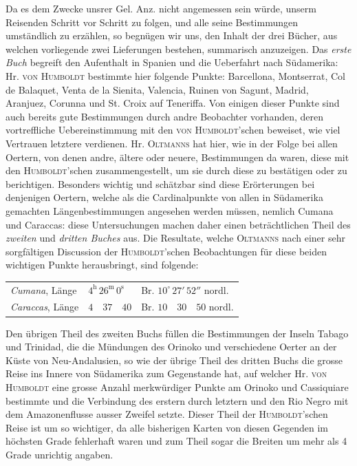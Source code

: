 Da es dem Zwecke unsrer Gel. Anz. nicht angemessen sein würde, unserm Reisenden Schritt vor Schritt zu folgen, und alle seine Bestimmungen umständlich zu erzählen, so begnügen wir uns, den Inhalt der drei Bücher, aus welchen vorliegende zwei Lieferungen bestehen, summarisch anzuzeigen. Das \emph{erste Buch} begreift den Aufenthalt in Spanien und die Ueberfahrt nach Südamerika: Hr. \textsc{von Humboldt} bestimmte hier folgende Punkte: Barcellona, Montserrat, Col de Balaquet, Venta de la Sienita, Valencia, Ruinen von Sagunt, Madrid, Aranjuez, Corunna und St. Croix auf Teneriffa. Von einigen dieser Punkte sind auch bereits gute Bestimmungen durch andre Beobachter vorhanden, deren vortreffliche Uebereinstimmung mit den \textsc{von Humboldt}'schen beweiset, wie viel Vertrauen letztere verdienen. Hr. \textsc{Oltmanns} hat hier, wie in der Folge bei allen Oertern, von denen andre, ältere oder neuere, Bestimmungen da waren, diese mit den \textsc{Humboldt}'schen zusammengestellt, um sie durch diese zu bestätigen oder zu berichtigen. Besonders wichtig und schätzbar sind diese Erörterungen bei denjenigen Oertern, welche als die Cardinalpunkte von allen in Südamerika gemachten Längenbestimmungen angesehen werden müssen, nemlich Cumana und Caraccas: diese Untersuchungen machen daher einen beträchtlichen Theil des \emph{zweiten} und \emph{dritten Buches} aus. Die Resultate, welche \textsc{Oltmanns} nach einer sehr sorgfältigen Discussion der \textsc{Humboldt}'schen Beobachtungen für diese beiden wichtigen Punkte herausbringt, sind folgende:
\begin{center} \begin{tabular}{@{}lll@{}} \textit{Cumana}, Länge & $4^{\mathrm h}\,26^{\mathrm m}\,0^{\mathrm s}$ & Br. $10^\circ\,27'\,52''$ nordl. \\ \textit{Caraccas}, Länge & $4\quad 37\quad 40$ & Br. $10\quad 30\quad 50$ nordl. \\ \end{tabular} \end{center}
\noindent Den übrigen Theil des zweiten Buchs füllen die Bestimmungen der Inseln Tabago und Trinidad, die die Mündungen des Orinoko und verschiedene Oerter an der Küste von Neu-Andalusien, so wie der übrige Theil des dritten Buchs die grosse Reise ins Innere von Südamerika zum Gegenstande hat, auf welcher Hr. \textsc{von Humboldt} eine grosse Anzahl merkwürdiger Punkte am Orinoko und Cassiquiare bestimmte und die Verbindung des erstern durch letztern und den Rio Negro mit dem Amazonenflusse ausser Zweifel setzte. Dieser Theil der \textsc{Humboldt}'schen Reise ist um so wichtiger, da alle bisherigen Karten von diesen Gegenden im höchsten Grade fehlerhaft waren und zum Theil sogar die Breiten um mehr als 4 Grade unrichtig angaben.

